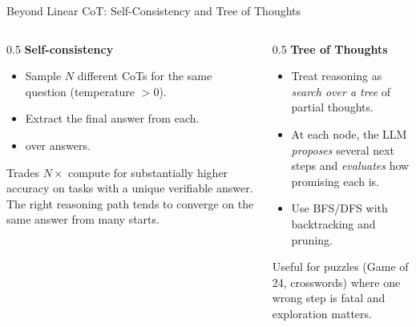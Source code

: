 \begin{frame}{Beyond Linear CoT: Self-Consistency and Tree of Thoughts}

  \begin{columns}[T]
    \begin{column}{0.5\textwidth}
      \textbf{Self-consistency}~\cite{wang2023selfconsistency}
      \begin{itemize}[nosep]
        \item Sample $N$ different CoTs for the same question (temperature $> 0$).
        \item Extract the final answer from each.
        \item {} over answers.
      \end{itemize}
      \vspace{0.2em}
      Trades $N{\times}$ compute for substantially higher accuracy on tasks with a unique
      verifiable answer. The right reasoning path tends to converge on the same answer from many starts.
    \end{column}
    \begin{column}{0.5\textwidth}
      \textbf{Tree of Thoughts}~\cite{yao2023tot}
      \begin{itemize}[nosep]
        \item Treat reasoning as \emph{search over a tree} of partial thoughts.
        \item At each node, the LLM \emph{proposes} several next steps and \emph{evaluates} how promising each is.
        \item Use BFS/DFS with backtracking and pruning.
      \end{itemize}
      Useful for puzzles (Game of 24, crosswords) where one wrong step is fatal and exploration matters.
    \end{column}
  \end{columns}

  \vspace{0.5em}
  \begin{center}
\end{center}
\end{frame}
